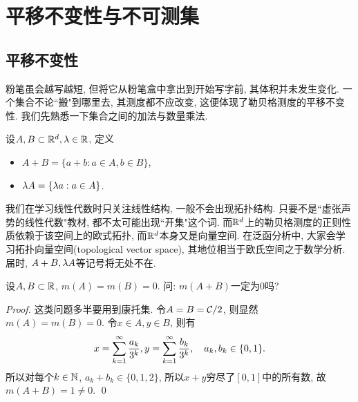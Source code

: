 \section{平移不变性与不可测集}
\subsection{平移不变性}
粉笔虽会越写越短, 但将它从粉笔盒中拿出到开始写字前, 其体积并未发生变化. 一个集合不论``搬"到哪里去, 其测度都不应改变, 这便体现了勒贝格测度的平移不变性. 
我们先熟悉一下集合之间的加法与数量乘法.
\begin{definition}
    设$A, B \subset \mathbb{R}^d, \lambda \in \mathbb{R}$, 定义
    \begin{itemize}
    \item $A+B=\{a+b: a\in A, b\in B\}$,
    \item $\lambda A = \{\lambda a: a \in A\}$.
    \end{itemize}
\end{definition}
我们在学习线性代数时只关注线性结构, 一般不会出现拓扑结构. 只要不是``虚张声势的线性代数"教材, 都不太可能出现``开集"这个词. 而$\mathbb{R}^d$上的勒贝格测度的正则性质依赖于该空间上的欧式拓扑, 而$\mathbb{R}^d$本身又是向量空间. 在泛函分析中, 大家会学习拓扑向量空间(topological vector space), 其地位相当于欧氏空间之于数学分析. 届时, $A+B, \lambda A$等记号将无处不在. 
\begin{example}
    设$A, B \subset \mathbb{R}$, $m(A) = m(B) = 0$. 问: $m(A+B)$一定为$0$吗?
\end{example}
\begin{proof}
    这类问题多半要用到康托集. 令$A = B = \mathcal{C} / 2$, 则显然$m(A) = m(B) = 0$. 
    令$x \in A, y \in B$, 则有
    \begin{align*}
    x = \sum_{k=1}^{\infty}\frac{a_k}{3^k}, y = \sum_{k=1}^{\infty}\frac{b_k}{3^k}, \quad a_k, b_k \in \{0, 1\}.
    \end{align*}
    所以对每个$k \in \mathbb{N}$, $a_k + b_k \in \{0, 1, 2\}$, 所以$x+y$穷尽了$[0,1]$中的所有数, 故$m(A+B) = 1 \neq 0$. \qed 
\end{proof}



